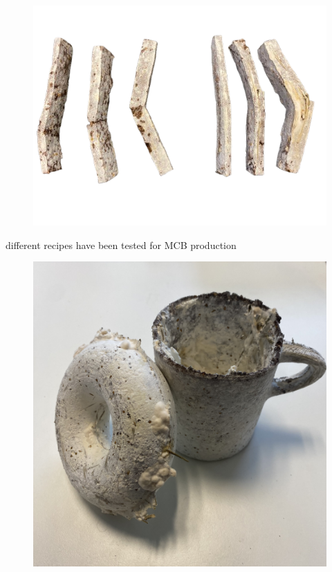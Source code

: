 \begin{figure}[h]
    \centering
    \includegraphics{images/IMG_1823-removebg-preview.png}
    \caption{}
    \label{fig:donutandcup}
\end{figure} 

different recipes have been tested for MCB production 










\begin{figure}[h]
    \centering
    \includegraphics{images/IMG_1838.JPG}
    \caption{}
    \label{fig:donutandcup}
\end{figure} 


